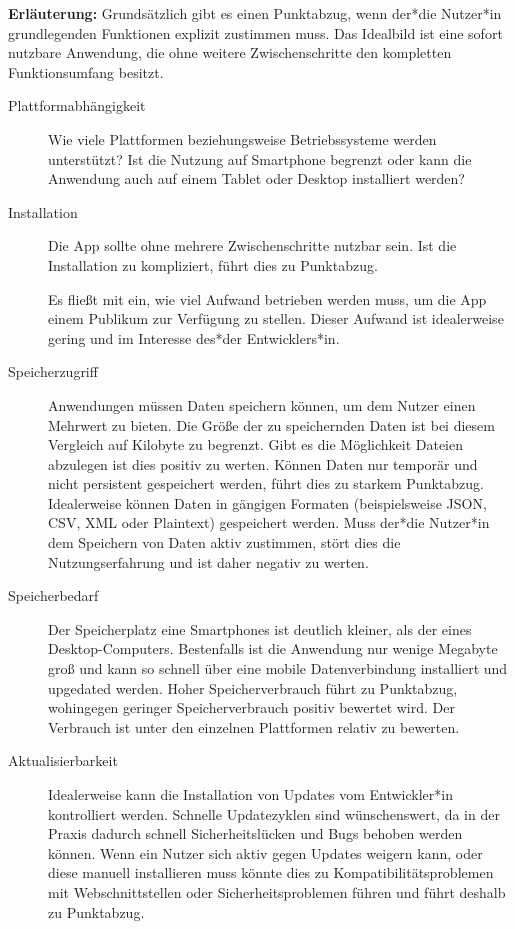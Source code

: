 \textbf{Erläuterung:}
Grundsätzlich gibt es einen Punktabzug, wenn der*die Nutzer*in grundlegenden Funktionen explizit zustimmen muss. Das Idealbild ist eine sofort nutzbare Anwendung, die ohne weitere Zwischenschritte den kompletten Funktionsumfang besitzt.
\begin{description}
	\item [Plattformabhängigkeit]
	      Wie viele Plattformen beziehungsweise Betriebssysteme werden unterstützt?
	      Ist die Nutzung auf Smartphone begrenzt oder kann die Anwendung auch auf einem Tablet oder Desktop installiert werden?

	\item [Installation]
	      Die App sollte ohne mehrere Zwischenschritte nutzbar sein. Ist die Installation zu kompliziert, führt dies zu Punktabzug.

	      Es fließt mit ein, wie viel Aufwand betrieben werden muss, um die App einem Publikum zur Verfügung zu stellen. Dieser Aufwand ist idealerweise gering und im Interesse des*der Entwicklers*in.

	\item [Speicherzugriff]
	      Anwendungen müssen Daten speichern können, um dem Nutzer einen Mehrwert zu bieten. Die Größe der zu speichernden Daten ist bei diesem Vergleich auf Kilobyte zu begrenzt. Gibt es die Möglichkeit Dateien abzulegen ist dies positiv zu werten.
	      Können Daten nur temporär und nicht persistent gespeichert werden, führt dies zu starkem Punktabzug. Idealerweise können Daten in gängigen Formaten (beispielsweise JSON, CSV, XML oder Plaintext) gespeichert werden. Muss der*die Nutzer*in dem Speichern von Daten aktiv zustimmen, stört dies die Nutzungserfahrung und ist daher negativ zu werten.

	\item [Speicherbedarf]
	      Der Speicherplatz eine Smartphones ist deutlich kleiner, als der eines Desktop-Computers. Bestenfalls ist die Anwendung nur wenige Megabyte groß und kann so schnell über eine mobile Datenverbindung installiert und upgedated werden.
	      Hoher Speicherverbrauch führt zu Punktabzug, wohingegen geringer Speicherverbrauch positiv bewertet wird. Der Verbrauch ist unter den einzelnen Plattformen relativ zu bewerten.

	\item [Aktualisierbarkeit]
	      Idealerweise kann die Installation von Updates vom Entwickler*in kontrolliert werden. Schnelle Updatezyklen sind wünschenswert, da in der Praxis dadurch schnell Sicherheitslücken und Bugs behoben werden können. Wenn ein Nutzer sich aktiv gegen Updates weigern kann, oder diese manuell installieren muss könnte dies zu Kompatibilitätsproblemen mit Webschnittstellen oder Sicherheitsproblemen führen und führt deshalb zu Punktabzug.


\end{description}
